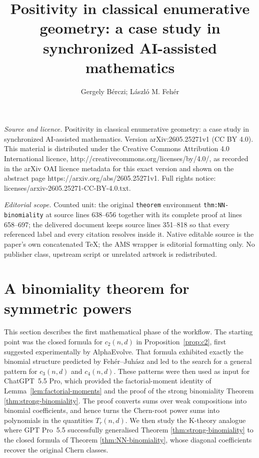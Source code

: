 \documentclass[10pt,a4paper]{amsart}
\numberwithin{equation}{section}
\begin{document}
\title[Positivity in classical enumerative geometry: a case study i]{Positivity in classical enumerative geometry: a case study in synchronized AI-assisted mathematics}
\author{Gergely Bérczi; László M. Fehér}
\date{}
\maketitle
\noindent\emph{Source and licence.} Positivity in classical enumerative geometry: a case study in synchronized AI-assisted mathematics. Version arXiv:2605.25271v1 (CC BY 4.0). This material is distributed under the Creative Commons Attribution 4.0 International licence, http://creativecommons.org/licenses/by/4.0/, as recorded in the arXiv OAI licence metadata for this exact version and shown on the abstract page https://arxiv.org/abs/2605.25271v1. Full rights notice: licenses/arxiv-2605.25271-CC-BY-4.0.txt.\par\smallskip
\noindent\textit{Editorial scope.} Counted unit: the original \texttt{theorem} environment \texttt{thm:NN-binomiality} at source lines 638--656 together with its complete proof at lines 658--697; the delivered document keeps source lines 351--818 so that every referenced label and every citation resolves inside it. Native editable source is the paper's own concatenated TeX; the AMS wrapper is editorial formatting only. No publisher class, upstream script or unrelated artwork is redistributed.
\section{A binomiality theorem for symmetric powers}
This section describes the first mathematical phase of the workflow.  The starting point was the closed formula for $c_2(n,d)$ in Proposition~\ref{prop:c2}, first suggested experimentally by AlphaEvolve.  That formula exhibited exactly the binomial structure predicted by Feh\'er--Juh\'asz and led to the search for a general pattern for $c_3(n,d)$ and $c_4(n,d)$.  These patterns were then used as input for ChatGPT~5.5 Pro, which provided the factorial-moment
identity of Lemma~\ref{lem:factorial-moments} and the proof of the strong
binomiality Theorem \ref{thm:strong-binomiality}. The proof converts sums over weak compositions into binomial coefficients, and hence turns the Chern-root power sums into polynomials in the quantities $T_r(n,d)$. We then study the K-theory analogue where GPT Pro~5.5 successfully generalised Theorem \ref{thm:strong-binomiality} to the closed formula of Theorem \ref{thm:NN-binomiality}, whose diagonal coefficients recover the original Chern classes.
\end{document}
